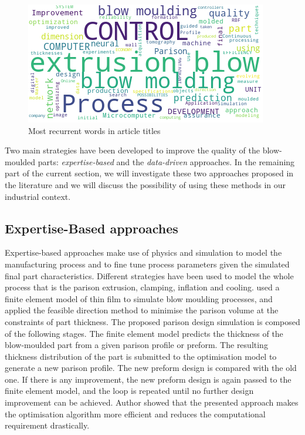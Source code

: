 \begin{figure}
\centerline{\includegraphics[scale=1]{images/chapter_2/wordcloud.png}}
\caption{Most recurrent words in article titles}
\label{fig:wordcloud}
\end{figure}

Two main strategies have been developed to improve the quality of the blow-moulded parts: \textit{expertise-based} and the \textit{data-driven } approaches. In the remaining part of the current section, we will investigate these two approaches proposed in the literature and we will discuss the possibility of using these methods in our industrial context. 


\subsection{Expertise-Based approaches} \label{Expertise-based approaches}

Expertise-based approaches make use of physics and simulation to model the manufacturing process and to fine tune process parameters given the simulated final part characteristics. Different strategies have been used to model the whole process that is the parison extrusion, clamping, inflation and cooling. \citet{lee1996prediction} used a finite element model of thin film to simulate blow moulding processes, and applied the feasible direction method to minimise the parison volume at the constraints of part thickness. The proposed parison design simulation is composed of the following stages. The finite element model predicts the thickness of the blow-moulded part from a given parison profile or preform. The resulting thickness distribution of the part is submitted to the optimisation model to generate a new parison profile. The new preform design is compared with the old one. If there is any improvement, the new preform design is again passed to the finite element model, and the loop is repeated until no further design improvement can be achieved. Author showed that the presented approach makes the optimisation algorithm more efficient and reduces the computational requirement drastically. 

